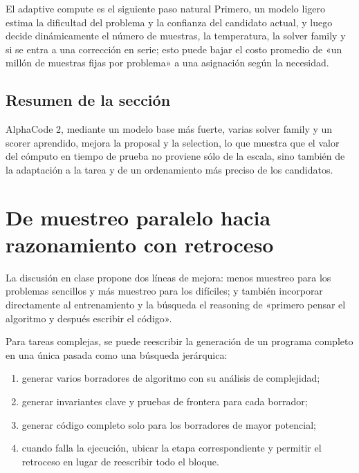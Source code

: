 \documentclass[a4paper]{article}
\begin{document}


\begin{knowledgebox}{El adaptive compute es el siguiente paso natural}
Primero, un modelo ligero estima la dificultad del problema y la confianza del candidato actual, y luego decide dinámicamente el número de muestras, la temperatura, la solver family y si se entra a una corrección en serie; esto puede bajar el costo promedio de «un millón de muestras fijas por problema» a una asignación según la necesidad.
\end{knowledgebox}

\subsection{Resumen de la sección}

AlphaCode 2, mediante un modelo base más fuerte, varias solver family y un scorer aprendido, mejora la proposal y la selection, lo que muestra que el valor del cómputo en tiempo de prueba no proviene sólo de la escala, sino también de la adaptación a la tarea y de un ordenamiento más preciso de los candidatos.
\section{De muestreo paralelo hacia razonamiento con retroceso}

La discusión en clase propone dos líneas de mejora: menos muestreo para los problemas sencillos y más muestreo para los difíciles; y también incorporar directamente al entrenamiento y la búsqueda el reasoning de «primero pensar el algoritmo y después escribir el código».

Para tareas complejas, se puede reescribir la generación de un programa completo en una única pasada como una búsqueda jerárquica:

\begin{enumerate}
    \item generar varios borradores de algoritmo con su análisis de complejidad;
    \item generar invariantes clave y pruebas de frontera para cada borrador;
    \item generar código completo solo para los borradores de mayor potencial;
    \item cuando falla la ejecución, ubicar la etapa correspondiente y permitir el retroceso en lugar de reescribir todo el bloque.
\end{enumerate}
\end{document}
